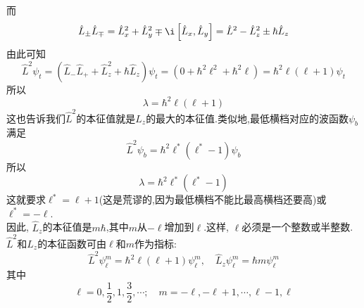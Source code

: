 \documentclass{ctexart}
\begin{document}
而
\[\hat{L}_{\pm}\hat{L}_{\mp}=\hat{L}_x^2+\hat{L}_y^2\mp\i\left[\hat{L}_x,\hat{L}_y\right]=\hat{L}^2-\hat{L}_z^2\pm\hbar\hat{L}_z\]
由此可知
\[\hat{L}^2\psi_t=\left(\hat{L}_-\hat{L}_++\hat{L}_z^2+\hbar\hat{L}_z\right)\psi_t=\left(0+\hbar^2\ell^2+\hbar^2\ell\right)=\hbar^2\ell(\ell+1)\psi_t\]
所以
\[\lambda=\hbar^2\ell(\ell+1)\]
这也告诉我们$\hat{L}^2$的本征值就是$\hat{L}_z$的最大的本征值.类似地,最低横档对应的波函数$\psi_b$满足
\[\hat{L}^2\psi_b=\hbar^2\ell^\ast\left(\ell^\ast-1\right)\psi_b\]
所以
\[\lambda=\hbar^2\ell^\ast\left(\ell^\ast-1\right)\]
这就要求$\ell^\ast=\ell+1$(这是荒谬的,因为最低横档不能比最高横档还要高)或$\ell^\ast=-\ell$.\\
\indent 因此, $\hat{L}_z$的本征值是$m\hbar$,其中$m$从$-\ell$增加到$\ell$.这样, $\ell$必须是一个整数或半整数. $\hat{L}^2$和$\hat{L}_z$的本征函数可由$\ell$和$m$作为指标:
\[\hat{L}^2\psi_\ell^m=\hbar^2\ell(\ell+1)\psi_{\ell}^m,\quad\hat{L}_z\psi_\ell^m=\hbar m\psi_\ell^m\]
其中
\[\ell=0,\dfrac12,1,\dfrac32,\cdots;\quad m=-\ell,-\ell+1,\cdots,\ell-1,\ell\]
\end{document}

